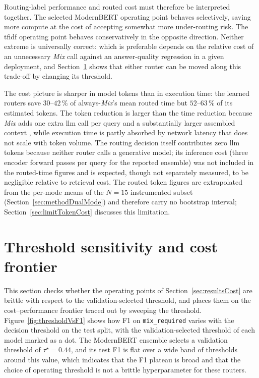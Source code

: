 \documentclass[english, bibtex]{kththesis}               %
\numberwithin{listing}{chapter}
\begin{document}
Routing-label performance and routed cost must therefore be interpreted together. The selected ModernBERT operating point behaves selectively, saving more compute at the cost of accepting somewhat more under-routing risk. The \gls{tfidf} operating point behaves conservatively in the opposite direction. Neither extreme is universally correct: which is preferable depends on the relative cost of an unnecessary \emph{Mix} call against an answer-quality regression in a given deployment, and Section~\ref{sec:resultsFrontier} shows that either router can be moved along this trade-off by changing its threshold.

The cost picture is sharper in model tokens than in execution time: the learned routers save $30$--$42\,\%$ of always-\emph{Mix}'s mean routed time but $52$--$63\,\%$ of its estimated tokens. The token reduction is larger than the time reduction because \emph{Mix} adds one extra \gls{llm} call per query and a substantially larger assembled context \cite{lightrag2024,microsoft2024graphragcosts}, while execution time is partly absorbed by network latency that does not scale with token volume. The routing decision itself contributes zero \gls{llm} tokens because neither router calls a generative model; its inference cost (three encoder forward passes per query for the reported ensemble) was not included in the routed-time figures and is expected, though not separately measured, to be negligible relative to retrieval cost. The routed token figures are extrapolated from the per-mode means of the $N = 15$ instrumented subset (Section~\ref{sec:methodDualMode}) and therefore carry no bootstrap interval; Section~\ref{sec:limitTokenCost} discusses this limitation.

\section{Threshold sensitivity and cost frontier}
\label{sec:resultsFrontier}

This section checks whether the operating points of Section~\ref{sec:resultsCost} are brittle with respect to the validation-selected threshold, and places them on the cost--performance frontier traced out by sweeping the threshold. Figure~\ref{fig:thresholdVsF1} shows how F1 on \texttt{mix\_required} varies with the decision threshold on the test split, with the validation-selected threshold of each model marked as a dot. The ModernBERT ensemble selects a validation threshold of $\tau^\star = 0.44$, and its test F1 is flat over a wide band of thresholds around this value, which indicates that the F1 plateau is broad and that the choice of operating threshold is not a brittle hyperparameter for these routers.
\end{document}
